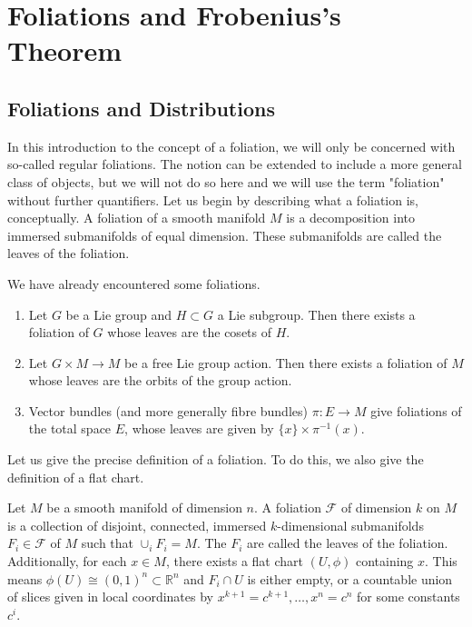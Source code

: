 \chapter{Foliations and Frobenius's Theorem}

\section{Foliations and Distributions}

In this introduction to the concept of a foliation, we will only be concerned with so-called regular foliations. The notion can be extended to include a more general class of objects, but we will not do so here and we will use the term "foliation" without further quantifiers. Let us begin by describing what a foliation is, conceptually. A foliation of a smooth manifold $M$ is a decomposition into immersed submanifolds of equal dimension. These submanifolds are called the leaves of the foliation. 
\begin{example}
  We have already encountered some foliations.
  \begin{enumerate}
    \item Let $G$ be a Lie group and $H\subset G$ a Lie subgroup. Then there exists a foliation of $G$ whose leaves are the cosets of $H$.
    \item Let $G\times M\to M$ be a free Lie group action. Then there exists a foliation of $M$ whose leaves are the orbits of the group action.
    \item Vector bundles (and more generally fibre bundles) $\pi:E\to M$ give foliations of the total space $E$, whose leaves are given by $\{x\}\times \pi^{-1}(x)$.
  \end{enumerate}
\end{example}
Let us give the precise definition of a foliation. To do this, we also give the definition of a flat chart.
\begin{definition}
  Let $M$ be a smooth manifold of dimension $n$. A foliation $\mathcal{F}$ of dimension $k$ on $M$ is a collection of disjoint, connected, immersed $k$-dimensional submanifolds $F_i\in\mathcal{F}$ of $M$ such that $\cup_iF_i=M$. The $F_i$ are called the leaves of the foliation. Additionally, for each $x\in M$, there exists a flat chart $(U,\phi)$ containing $x$. This means $\phi(U)\cong (0,1)^n\subset\mathbb{R}^n$ and $F_i\cap U$ is either empty, or a countable union of slices given in local coordinates by $x^{k+1}=c^{k+1},\dots,x^n=c^n$ for some constants $c^i$.
\end{definition}
